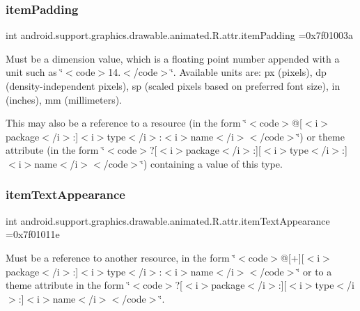 \subsubsection{\texorpdfstring{item\+Padding}{itemPadding}}
{\footnotesize\ttfamily int android.\+support.\+graphics.\+drawable.\+animated.\+R.\+attr.\+item\+Padding =0x7f01003a\hspace{0.3cm}{\ttfamily [static]}}

Must be a dimension value, which is a floating point number appended with a unit such as \char`\"{}$<$code$>$14.\+5sp$<$/code$>$\char`\"{}. Available units are\+: px (pixels), dp (density-\/independent pixels), sp (scaled pixels based on preferred font size), in (inches), mm (millimeters). 

This may also be a reference to a resource (in the form \char`\"{}$<$code$>$@\mbox{[}$<$i$>$package$<$/i$>$\+:\mbox{]}$<$i$>$type$<$/i$>$\+:$<$i$>$name$<$/i$>$$<$/code$>$\char`\"{}) or theme attribute (in the form \char`\"{}$<$code$>$?\mbox{[}$<$i$>$package$<$/i$>$\+:\mbox{]}\mbox{[}$<$i$>$type$<$/i$>$\+:\mbox{]}$<$i$>$name$<$/i$>$$<$/code$>$\char`\"{}) containing a value of this type. \mbox{\label{classandroid_1_1support_1_1graphics_1_1drawable_1_1animated_1_1R_1_1attr_aac64abe6869bfdef8ed40f476c55a8e1}} 
\subsubsection{\texorpdfstring{item\+Text\+Appearance}{itemTextAppearance}}
{\footnotesize\ttfamily int android.\+support.\+graphics.\+drawable.\+animated.\+R.\+attr.\+item\+Text\+Appearance =0x7f01011e\hspace{0.3cm}{\ttfamily [static]}}

Must be a reference to another resource, in the form \char`\"{}$<$code$>$@\mbox{[}+\mbox{]}\mbox{[}$<$i$>$package$<$/i$>$\+:\mbox{]}$<$i$>$type$<$/i$>$\+:$<$i$>$name$<$/i$>$$<$/code$>$\char`\"{} or to a theme attribute in the form \char`\"{}$<$code$>$?\mbox{[}$<$i$>$package$<$/i$>$\+:\mbox{]}\mbox{[}$<$i$>$type$<$/i$>$\+:\mbox{]}$<$i$>$name$<$/i$>$$<$/code$>$\char`\"{}. \mbox{\label{classandroid_1_1support_1_1graphics_1_1drawable_1_1animated_1_1R_1_1attr_a84305594d8dfae507b76024a56f59092}} 
